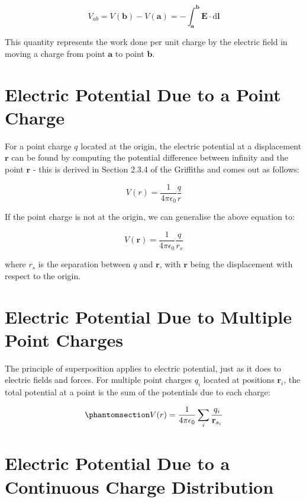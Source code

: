 \documentclass[
  letterpaper,
  DIV=11,
  numbers=noendperiod]{scrreprt}
\begin{document}
\[ V_{ab} = V(\mathrm{\mathbf{b}}) − V(\mathrm{\mathbf{a}}) = -\int_{\mathrm{\mathbf{a}}}^{\mathrm{\mathbf{b}}} \mathrm{\mathbf{E}}\cdot \mathrm{d} \mathrm{\mathbf{l}}\]

This quantity represents the work done per unit charge by the electric
field in moving a charge from point \(\mathrm{\mathbf{a}}\) to point
\(\mathrm{\mathbf{b}}\).

\section{Electric Potential Due to a Point
Charge}\label{electric-potential-due-to-a-point-charge}

For a point charge \(q\) located at the origin, the electric potential
at a displacement \(\mathrm{\mathbf{r}}\) can be found by computing the
potential difference between infinity and the point
\(\mathrm{\mathbf{r}}\) - this is derived in Section 2.3.4 of the
Griffiths and comes out as follows:

\[ V(r) = \frac{1}{4\pi\epsilon_0} \frac{q}{r} \]

If the point charge is not at the origin, we can generalise the above
equation to:

\[ V(\mathrm{\mathbf{r}}) = \frac{1}{4\pi\epsilon_0} \frac{q}{r_s} \]

where \(r_s\) is the separation between \(q\) and
\(\mathrm{\mathbf{r}}\), with \(\mathrm{\mathbf{r}}\) being the
displacement with respect to the origin.

\section{Electric Potential Due to Multiple Point
Charges}\label{electric-potential-due-to-multiple-point-charges}

The principle of superposition applies to electric potential, just as it
does to electric fields and forces. For multiple point charges \(q_i\)
located at positions \(\mathrm{\mathbf{r}}_i\), the total potential at a
point is the sum of the potentials due to each
charge:

\begin{equation}\phantomsection\label{eq-Vmulti}{ V(r) = \frac{1}{4\pi \epsilon_0} \sum_{i} \frac{q_i}{\mathrm{\mathbf{r}}_{s_i}} }\end{equation}

\section{Electric Potential Due to a Continuous Charge
Distribution}\label{electric-potential-due-to-a-continuous-charge-distribution}
\end{document}
